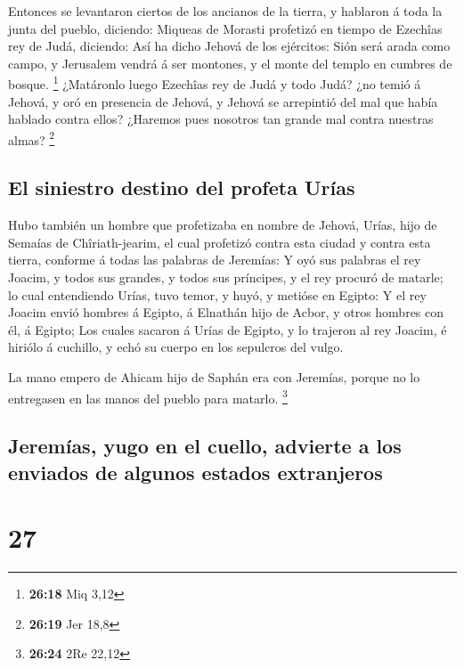  Entonces se levantaron ciertos de los ancianos de la
tierra, y hablaron á toda la junta del pueblo, diciendo: 
Miqueas de Morasti profetizó en tiempo de Ezechîas rey de Judá,
diciendo: Así ha dicho Jehová de los ejércitos: Sión será arada como
campo, y Jerusalem vendrá á ser montones, y el monte del templo en
cumbres de bosque. \footnote{\textbf{26:18} Miq 3,12} 
¿Matáronlo luego Ezechîas rey de Judá y todo Judá? ¿no temió á Jehová, y
oró en presencia de Jehová, y Jehová se arrepintió del mal que había
hablado contra ellos? ¿Haremos pues nosotros tan grande mal contra
nuestras almas? \footnote{\textbf{26:19} Jer 18,8}

\hypertarget{el-siniestro-destino-del-profeta-uruxedas}{%
\subsection{El siniestro destino del profeta
Urías}\label{el-siniestro-destino-del-profeta-uruxedas}}

 Hubo también un hombre que profetizaba en nombre de
Jehová, Urías, hijo de Semaías de Chîriath-jearim, el cual profetizó
contra esta ciudad y contra esta tierra, conforme á todas las palabras
de Jeremías:  Y oyó sus palabras el rey Joacim, y todos sus
grandes, y todos sus príncipes, y el rey procuró de matarle; lo cual
entendiendo Urías, tuvo temor, y huyó, y metióse en Egipto:
 Y el rey Joacim envió hombres á Egipto, á Elnathán hijo de
Acbor, y otros hombres con él, á Egipto;  Los cuales
sacaron á Urías de Egipto, y lo trajeron al rey Joacim, é hiriólo á
cuchillo, y echó su cuerpo en los sepulcros del vulgo.

 La mano empero de Ahicam hijo de Saphán era con Jeremías,
porque no lo entregasen en las manos del pueblo para matarlo.
\footnote{\textbf{26:24} 2Re 22,12}

\hypertarget{jeremuxedas-yugo-en-el-cuello-advierte-a-los-enviados-de-algunos-estados-extranjeros}{%
\subsection{Jeremías, yugo en el cuello, advierte a los enviados de
algunos estados
extranjeros}\label{jeremuxedas-yugo-en-el-cuello-advierte-a-los-enviados-de-algunos-estados-extranjeros}}

\hypertarget{section-26}{%
\section{27}\label{section-26}}

